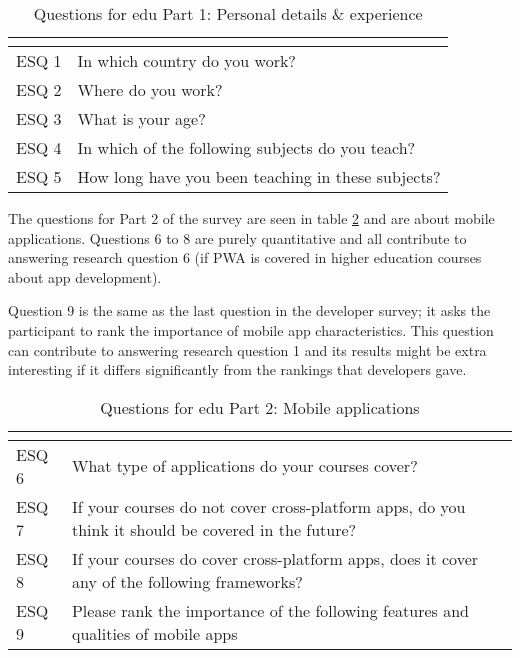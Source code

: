 \documentclass[a4paper,12pt]{article}
\begin{document}
\begin{table}[ht]
\centering
{}
\begin{tabular}{|l|l|}
\hline
\rowcolor[HTML]{656565} 
\multicolumn{1}{|c|}{\cellcolor[HTML]{656565}{\color[HTML]{FFFFFF} Number}} & \multicolumn{1}{l|}{\cellcolor[HTML]{656565}{\color[HTML]{FFFFFF} Question}} \\ \hline
ESQ 1 & In which country do you work? \\
ESQ 2 & Where do you work? \\
ESQ 3 & What is your age? \\
ESQ 4 & In which of the following subjects do you teach? \\
ESQ 5 & How long have you been teaching in these subjects? \\
\hline
\end{tabular}
\caption{Questions for edu Part 1: Personal details \& experience}
\label{tab:eduq1}
\end{table}

The questions for Part 2 of the survey are seen in table \ref{tab:eduq2} and are about mobile applications. Questions 6 to 8 are purely quantitative and all contribute to answering research question 6 (if PWA is covered in higher education courses about app development). 

Question 9 is the same as the last question in the developer survey; it asks the participant to rank the importance of mobile app characteristics. This question can contribute to answering research question 1 and its results might be extra interesting if it differs significantly from the rankings that developers gave.
\newpage

\begin{table}[ht]
\centering
{}
\begin{tabular}{|l|p{11cm}|}
\hline
\rowcolor[HTML]{656565} 
\multicolumn{1}{|c|}{\cellcolor[HTML]{656565}{\color[HTML]{FFFFFF} Number}} & \multicolumn{1}{l|}{\cellcolor[HTML]{656565}{\color[HTML]{FFFFFF} Question}} \\ \hline
ESQ 6 & What type of applications do your courses cover? \\
ESQ 7 & If your courses do not cover cross-platform apps, do you think it should be covered in the future? \\
ESQ 8 & If your courses do cover cross-platform apps, does it cover any of the following frameworks? \\
ESQ 9 & Please rank the importance of the following features and qualities of mobile apps \\
\hline
\end{tabular}
\caption{Questions for edu Part 2: Mobile applications}
\label{tab:eduq2}
\end{table}
\end{document}
